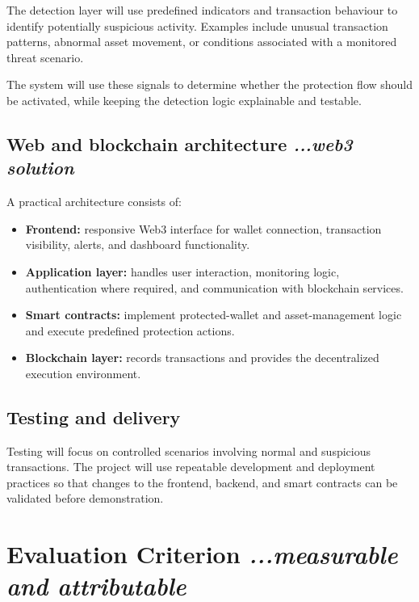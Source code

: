 \documentclass[10pt,a4paper]{article}
\begin{document}
The detection layer will use predefined indicators and transaction behaviour to identify potentially suspicious activity. Examples include unusual transaction patterns, abnormal asset movement, or conditions associated with a monitored threat scenario.

The system will use these signals to determine whether the protection flow should be activated, while keeping the detection logic explainable and testable.

\subsection{Web and blockchain architecture \hfill \normalfont\itshape ...web3 solution}

A practical architecture consists of:

\begin{itemize}
    \item \textbf{Frontend:} responsive Web3 interface for wallet connection, transaction visibility, alerts, and dashboard functionality.

    \item \textbf{Application layer:} handles user interaction, monitoring logic, authentication where required, and communication with blockchain services.

    \item \textbf{Smart contracts:} implement protected-wallet and asset-management logic and execute predefined protection actions.

    \item \textbf{Blockchain layer:} records transactions and provides the decentralized execution environment.
\end{itemize}

\subsection{Testing and delivery}

Testing will focus on controlled scenarios involving normal and suspicious transactions. The project will use repeatable development and deployment practices so that changes to the frontend, backend, and smart contracts can be validated before demonstration.

\section{Evaluation Criterion \hfill \normalfont\itshape ...measurable and attributable}
\end{document}
